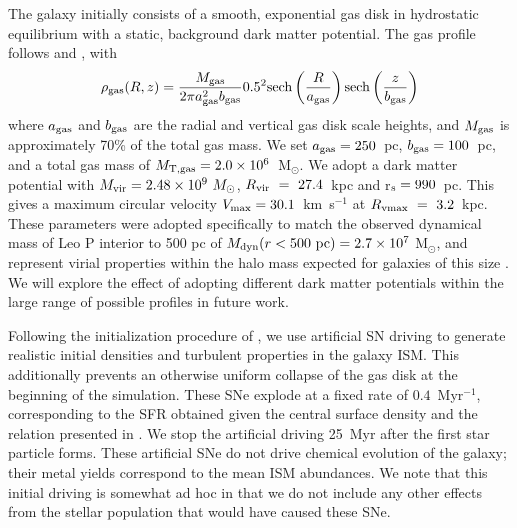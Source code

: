 \documentclass[twocolumn]{aastex61}
\begin{document}
The galaxy initially consists of a smooth, exponential gas disk in hydrostatic equilibrium with a static, background dark matter potential. The gas profile follows \citet{Tonnesen2009} and \citet{Salem2015}, with
\begin{equation}
\rho_{\rm gas} (R,z) = \frac{M_{\rm gas}}{2\pi a^2_{\rm gas}b_{\rm gas}} 0.5^2{\rm sech}\left(\frac{R}{a_{\rm gas}}\right){\rm sech}\left(\frac{z}{b_{\rm gas}}\right)
\end{equation}
where $a_{\rm gas}$ and $b_{\rm gas}$ are the radial and vertical gas disk scale heights, and $M_{\rm gas}$ is approximately 70\% of the total gas mass. We set $a_{\rm gas} = 250$~pc, $b_{\rm gas} = 100$~pc, and a total gas mass of $M_{\rm T,gas} = 2.0\times 10^6$~M$_{\odot}$. We adopt a \citet{Burkert1995} dark matter potential with $M_{\rm vir} = 2.48\times 10^{9}~M_{\odot}$, $R_{\rm vir}~=~27.4$~kpc and r$_{\rm s} = 990$~pc. This gives a maximum circular velocity $V_{\rm max} = 30.1$~km~s$^{-1}$ at $R_{\rm vmax}~=~3.2$~kpc. These parameters were adopted specifically to match the observed dynamical mass of Leo P interior to 500 pc of $M_{\rm dyn} (r < 500~\rm{pc}) = 2.7\times 10^{7}$ M$_{\odot}$, and represent virial properties within the halo mass expected for galaxies of this size \citep{Ferrero2012}. We will explore the effect of adopting different dark matter potentials within the large range of possible profiles in future work.

Following the initialization procedure of \citet{Hu2017}, we use artificial SN driving to generate realistic initial densities and turbulent properties in the galaxy ISM. This additionally prevents an otherwise uniform collapse of the gas disk at the beginning of the simulation. These SNe explode at a fixed rate of $0.4$~Myr$^{-1}$, corresponding to the SFR obtained given the central  surface density and the relation presented in \citep{Roychowdhury2009}. We stop the artificial driving 25~Myr after the first star particle forms. These artificial SNe do not drive chemical evolution of the galaxy; their metal yields correspond to the mean ISM abundances. We note that this initial driving is somewhat ad hoc in that we do not include any other effects from the stellar population that would have caused these SNe.
\end{document}
